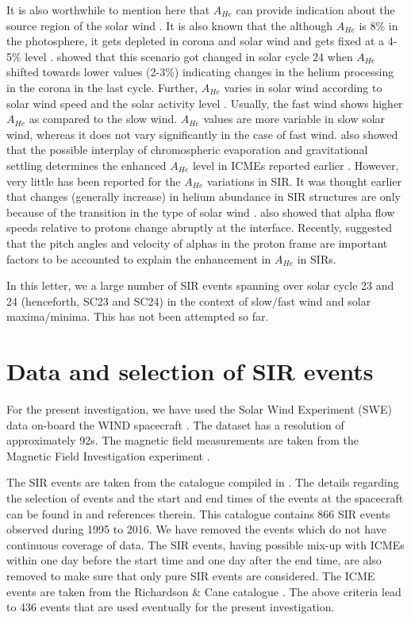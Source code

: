 \documentclass[letters,usenatbib]{mnras}
\begin{document}
It is also worthwhile to mention here that $A_{He}$ can provide indication about the source region of the solar wind \citep[e.g.,][]{Borrini1982, Kasper2007}. It is also known that the although $A_{He}$ is 8\% in the photosphere, it gets depleted in corona and solar wind and gets fixed at a 4-5\% level \citep{Laming2004}. \cite{Yogesh2021} showed that this scenario got changed in solar cycle 24 when $A_{He}$ shifted towards lower values (2-3\%) indicating changes in the helium processing in the corona in the last cycle. Further, $A_{He}$ varies in solar wind according to solar wind speed and the solar activity level \citep{Kasper2007, Alterman2019, Yogesh2021}. Usually, the fast wind shows higher $A_{He}$ as compared to the slow wind. $A_{He}$ values are more variable in slow solar wind, whereas it does not vary significantly in the case of fast wind. \cite{Yogesh2022} also showed that the possible interplay of chromospheric evaporation and gravitational settling determines the enhanced $A_{He}$ level in ICMEs reported earlier \citep[e.g.][etc.]{Borrini1982, Fu2020}. However, very little has been reported for the $A_{He}$ variations in SIR. It was thought earlier that changes (generally increase) in helium abundance in SIR structures are only because of the transition in the type of solar wind \citep{Gosling1978, Wimmer1997}. \cite{Gosling1978} also showed that alpha flow speeds relative to protons change abruptly at the interface. Recently, \cite{Durovcova2019} suggested that the pitch angles and velocity of alphas in the proton frame are important factors to be accounted to explain the enhancement in $A_{He}$ in SIRs. 

	In this letter, we  a large number of SIR events spanning over solar cycle 23 and 24 (henceforth, SC23 and SC24) in the context of slow/fast wind and solar maxima/minima. This has not been attempted so far.  

\section{Data and selection of SIR events}
For the present investigation, we have used the Solar Wind Experiment (SWE) data on-board the WIND spacecraft  \citep{Ogilvie1995}. The dataset has a resolution of approximately 92s. The magnetic field measurements are taken from the Magnetic Field Investigation experiment \citep{Lepping1995}. 

The SIR events are taken from the catalogue compiled in \cite{Chi2018}. The details regarding the selection of events and the start and end times of the events at the spacecraft can be found in \cite{Chi2018} and references therein. This catalogue contains 866 SIR events observed during 1995 to 2016. We have removed the events which do not have continuous coverage of data. The SIR events, having possible mix-up with ICMEs within one day before the start time and one day after the end time, are also removed to make sure that only pure SIR events are considered. The ICME events are taken from the Richardson \& Cane catalogue \citep{Richardson2010}. The above criteria lead to 436 events that are used eventually for the present investigation. 
\end{document}
